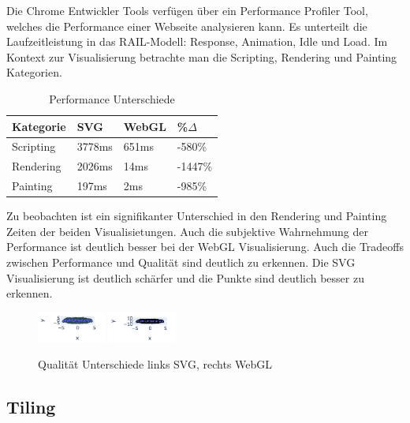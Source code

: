 \documentclass{article}
\begin{document}
\noindent
Die Chrome Entwickler Tools verfügen über ein Performance Profiler Tool, welches die Performance einer Webseite analysieren kann. Es unterteilt die Laufzeitleistung in das RAIL-Modell\cite{noauthor_measure_nodate}: Response, Animation, Idle und Load.
Im Kontext zur Visualisierung betrachte man die Scripting, Rendering und Painting Kategorien.\cite{kayce_basques_analyze_nodate}

\begin{table}[!h]
\centering
\begin{tabular}{|l|l|l|l|}
\hline
\textbf{Kategorie} & \textbf{SVG} & \textbf{WebGL} & \textbf{\%$\Delta$} \\
\hline
Scripting & 3778ms & 651ms & -580\% \\
\hline
Rendering & 2026ms & 14ms & -1447\% \\
\hline
Painting & 197ms & 2ms & -985\% \\
\hline
\end{tabular}
\caption{\label{tab: LE1 Performance}Performance Unterschiede}
\end{table}

\noindent
Zu beobachten ist ein signifikanter Unterschied in den Rendering und Painting Zeiten der beiden Visualisietungen. Auch die subjektive Wahrnehmung der Performance ist deutlich besser bei der WebGL Visualisierung.
Auch die Tradeoffs zwischen Performance und Qualität sind deutlich zu erkennen. Die SVG Visualisierung ist deutlich schärfer und die Punkte sind deutlich besser zu erkennen.
\begin{figure}[!h]
\centering
\includegraphics[width=0.2\textwidth]{img/svg_quality.png}
\includegraphics[width=0.2\textwidth]{img/webgl_quality.png}
\setlength{\belowcaptionskip}{-10pt}
\caption{\label{fig: LE1 Qualität Unterschiede} Qualität Unterschiede links SVG, rechts WebGL}
\end{figure}
\newpage

\subsection{Tiling}
\end{document}
